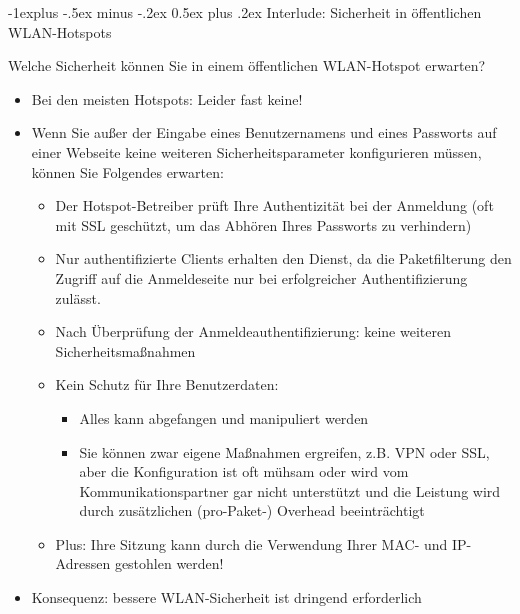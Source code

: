 \documentclass[a4paper]{article}
\makeatletter
\renewcommand{\subsection}{\@startsection{subsection}{2}{0mm}%
 {-1explus -.5ex minus -.2ex}%
 {0.5ex plus .2ex}%
 {\normalfont\normalsize\bfseries}}
\makeatother
\begin{document}
\begin{multicols}{3}
    \subsection{Interlude: Sicherheit in öffentlichen
        WLAN-Hotspots}

    Welche Sicherheit können Sie in einem öffentlichen WLAN-Hotspot
    erwarten?

    \begin{itemize}
        \item
              Bei den meisten Hotspots: Leider fast keine!
        \item
              Wenn Sie außer der Eingabe eines Benutzernamens und eines Passworts
              auf einer Webseite keine weiteren Sicherheitsparameter konfigurieren
              müssen, können Sie Folgendes erwarten:

              \begin{itemize}
                  \item
                        Der Hotspot-Betreiber prüft Ihre Authentizität bei der Anmeldung
                        (oft mit SSL geschützt, um das Abhören Ihres Passworts zu
                        verhindern)
                  \item
                        Nur authentifizierte Clients erhalten den Dienst, da die
                        Paketfilterung den Zugriff auf die Anmeldeseite nur bei
                        erfolgreicher Authentifizierung zulässt.
                  \item
                        Nach Überprüfung der Anmeldeauthentifizierung: keine weiteren
                        Sicherheitsmaßnahmen
                  \item
                        Kein Schutz für Ihre Benutzerdaten:

                        \begin{itemize}
                            \item
                                  Alles kann abgefangen und manipuliert werden
                            \item
                                  Sie können zwar eigene Maßnahmen ergreifen, z.B. VPN oder SSL,
                                  aber die Konfiguration ist oft mühsam oder wird vom
                                  Kommunikationspartner gar nicht unterstützt und die Leistung wird
                                  durch zusätzlichen (pro-Paket-) Overhead beeinträchtigt
                        \end{itemize}
                  \item
                        Plus: Ihre Sitzung kann durch die Verwendung Ihrer MAC- und
                        IP-Adressen gestohlen werden!
              \end{itemize}
        \item
              Konsequenz: bessere WLAN-Sicherheit ist dringend erforderlich
    \end{itemize}



\end{multicols}
\end{document}
